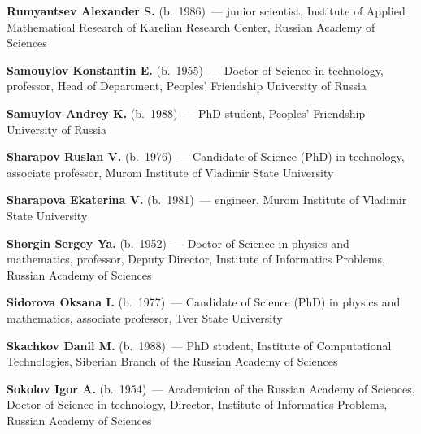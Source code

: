\begin{multicols}{2}
\vspace*{5pt}

\noindent
\textbf{Rumyantsev Alexander S.} (b.\ 1986)~--- junior scientist, 
Institute of  Applied Mathematical Research of Karelian Research Center, 
Russian Academy of Sciences

\vspace*{5pt}


\noindent
\textbf{Samouylov Konstantin E.} (b.\ 1955)~--- Doctor of Science in technology, professor, 
Head of Department, Peoples' Friendship University of Russia

\vspace*{5pt}

\noindent
\textbf{Samuylov Andrey K.} (b.\ 1988)~--- PhD student, Peoples' Friendship University 
of Russia




\vspace*{5pt}

\noindent
\textbf{Sharapov Ruslan V.} (b.\ 1976)~--- Candidate of Science (PhD) in technology, 
associate professor, Murom Institute of Vladimir State University

\vspace*{5pt}

\noindent
\textbf{Sharapova Ekaterina V.} (b.\ 1981)~--- engineer, Murom Institute of 
Vladimir State University

\vspace*{5pt}

\noindent
\textbf{Shorgin Sergey Ya.} (b.\ 1952)~--- Doctor of Science in physics and 
mathematics, professor, Deputy Director, Institute of Informatics Problems, 
Russian Academy of Sciences

\vspace*{5pt}

\noindent
\textbf{Sidorova Oksana I.} (b.\ 1977)~--- Candidate of Science (PhD) in physics and mathematics,
associate professor, Tver State University

\vspace*{5pt}

\noindent
\textbf{Skachkov Danil M.} (b.\ 1988)~--- PhD student, Institute of Computational Technologies, 
Siberian Branch of the Russian Academy of Sciences


\vspace*{5pt}

\noindent 
\textbf{Sokolov Igor A.} (b.\ 1954)~--- Academician of the Russian Academy of Sciences,
Doctor of Science in technology, Director,
Institute of Informatics Problems,  Russian Academy of Sciences



\end{multicols}
